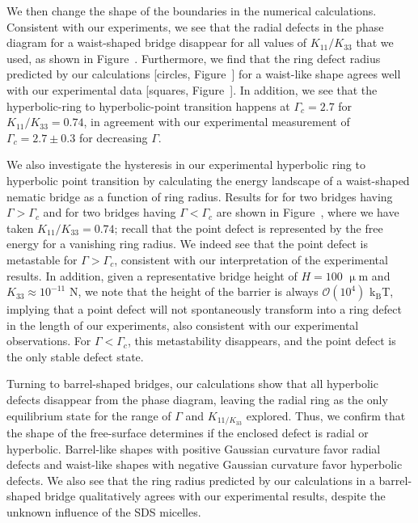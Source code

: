 We then change the shape of the boundaries in the numerical calculations.
Consistent with our experiments, we see that the radial defects in the phase diagram for a waist-shaped bridge disappear for all values of $K_{11}/K_{33}$ that we used, as shown in Figure~.
Furthermore, we find that the ring defect radius predicted by our calculations [circles, Figure~] for a waist-like shape agrees well with our experimental data [squares, Figure~].
In addition, we see that the hyperbolic-ring to hyperbolic-point transition happens at $\Gamma_c = 2.7$ for $K_{11}/K_{33} = 0.74$, in agreement with our experimental measurement of $\Gamma_c = 2.7 \pm 0.3$ for decreasing $\Gamma$.

We also investigate the hysteresis in our experimental hyperbolic ring to hyperbolic point transition by calculating the energy landscape of a waist-shaped nematic bridge as a function of ring radius.
Results for for two bridges having $\Gamma > \Gamma_c$ and for two bridges having $\Gamma < \Gamma_c$ are shown in Figure~, where we have taken $K_{11}/K_{33} = 0.74$; recall that the point defect is represented by the free energy for a vanishing ring radius.
We indeed see that the point defect is metastable for $\Gamma > \Gamma_c$, consistent with our interpretation of the experimental results.
In addition, given a representative bridge height of $H = 100$ $\upmu$m and $K_{33} \approx 10^{-11}$ N, we note that the height of the barrier is always $\mathcal{O} \left ( 10^{4} \right )$ k$_\textrm{B}$T, implying that a point defect will not spontaneously transform into a ring defect in the length of our experiments, also consistent with our experimental observations.
For $\Gamma < \Gamma_c$, this metastability disappears, and the point defect is the only stable defect state.

Turning to barrel-shaped bridges, our calculations show that all hyperbolic defects disappear from the phase diagram, leaving the radial ring as the only equilibrium state for the range of $\Gamma$ and $K_{11/K_{33}}$ explored.
Thus, we confirm that the shape of the free-surface determines if the enclosed defect is radial or hyperbolic.
Barrel-like shapes with positive Gaussian curvature favor radial defects and waist-like shapes with negative Gaussian curvature favor hyperbolic defects.
We also see that the ring radius predicted by our calculations in a barrel-shaped bridge qualitatively agrees with our experimental results, despite the unknown influence of the SDS micelles.





